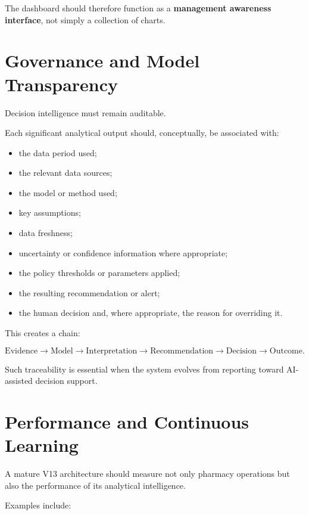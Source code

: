 \documentclass[11pt,a4paper]{article}
\begin{document}
The dashboard should therefore function as a \textbf{management awareness
interface}, not simply a collection of charts.

\section{Governance and Model Transparency}

Decision intelligence must remain auditable.

Each significant analytical output should, conceptually, be associated with:

\begin{itemize}
\item the data period used;
\item the relevant data sources;
\item the model or method used;
\item key assumptions;
\item data freshness;
\item uncertainty or confidence information where appropriate;
\item the policy thresholds or parameters applied;
\item the resulting recommendation or alert;
\item the human decision and, where appropriate, the reason for overriding it.
\end{itemize}

This creates a chain:

\[
\text{Evidence}
\rightarrow
\text{Model}
\rightarrow
\text{Interpretation}
\rightarrow
\text{Recommendation}
\rightarrow
\text{Decision}
\rightarrow
\text{Outcome}.
\]

Such traceability is essential when the system evolves from reporting toward
AI-assisted decision support.

\section{Performance and Continuous Learning}

A mature V13 architecture should measure not only pharmacy operations but also
the performance of its analytical intelligence.

Examples include:
\end{document}
